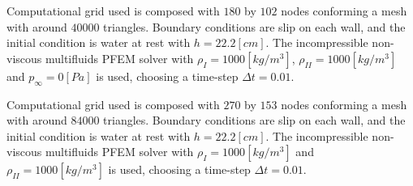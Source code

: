 Computational grid used is composed with $180$ by $102$ nodes conforming a mesh with around $40000$ triangles. Boundary conditions are slip on each wall, and the initial condition is water at rest with $h=22.2[cm]$. The incompressible non-viscous multifluids PFEM solver with $\rho_{I}=1000[kg/m^3]$, $\rho_{II}=1000[kg/m^3]$ and $p_{\infty}=0[Pa]$ is used, choosing a time-step $\Delta t=0.01$.

Computational grid used is composed with $270$ by $153$ nodes conforming a mesh with around $84000$ triangles. Boundary conditions are slip on each wall, and the initial condition is water at rest with $h=22.2[cm]$. The incompressible non-viscous multifluids PFEM solver with $\rho_{I}=1000[kg/m^3]$ and $\rho_{II}=1000[kg/m^3]$ is used, choosing a time-step $\Delta t=0.01$.